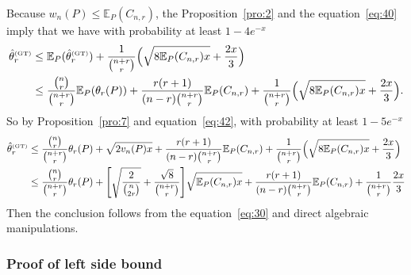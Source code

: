 \documentclass{article}
\newcommand{\1}{\boldsymbol{1}}
\newcommand{\EE}{\mathbb{E}}
\theoremstyle{plain}
\begin{document}
Because $w_n(P) \leq \EE_P(C_{n,r})$, the Proposition~\ref{pro:2} and the equation~\eqref{eq:40} imply that we have with probability at least $1 - 4e^{-x}$
\begin{align*}
  \hat{\theta}_r^{\text{\tiny{(GT)}}}
  &\leq \EE_P(\hat{\theta}_r^{\text{\tiny{(GT)}}}) + \frac{1}{\binom{n+r}{r}}\Big( \sqrt{8\EE_P(C_{n,r})x} + \frac{2x}{3} \Big)\\
  &\leq \frac{\binom{n}{r}}{\binom{n+r}{r}} \EE_P(\theta_r(P))%
    + \frac{r(r+1)}{(n-r)\binom{n+r}{r}}\EE_P(C_{n,r})%
    + \frac{1}{\binom{n+r}{r}}\Big( \sqrt{8\EE_P(C_{n,r})x} + \frac{2x}{3} \Big).
\end{align*}
So by Proposition~\ref{pro:7} and equation~\eqref{eq:42}, with probability at least $1 - 5e^{-x}$
\begin{align*}
  \hat{\theta}_r^{\text{\tiny{(GT)}}}%
  &\leq \frac{\binom{n}{r}}{\binom{n+r}{r}} \theta_r(P)%
    + \sqrt{2v_n(P)x}
    + \frac{r(r+1)}{(n-r)\binom{n+r}{r}}\EE_P(C_{n,r})%
    + \frac{1}{\binom{n+r}{r}}\Big( \sqrt{8\EE_P(C_{n,r})x} + \frac{2x}{3} \Big)\\
  &\leq \frac{\binom{n}{r}}{\binom{n+r}{r}} \theta_r(P)%
    + \Bigg[ \sqrt{\frac{2}{\binom{n}{2r}}}%
    + \frac{\sqrt{8}}{\binom{n+r}{r}}
    \Bigg] \sqrt{ \EE_P(C_{n,r}) x}%
    + \frac{r(r+1)}{(n-r)\binom{n+r}{r}}\EE_P(C_{n,r})%
    + \frac{1}{\binom{n+r}{r}}\frac{2x}{3}
\end{align*}
Then the conclusion follows from the equation~\eqref{eq:30} and direct algebraic manipulations.




\subsubsection{Proof of left side bound}
\end{document}
